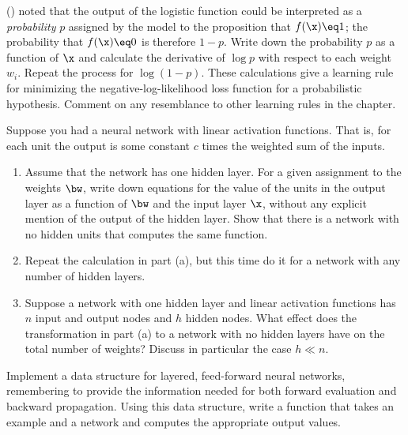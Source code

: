 \begin{exercise}
() noted that the output of the
logistic function could be interpreted as a {\em probability} \(p\)
assigned by the model to the proposition that \(f(\x)\eq 1\); the
probability that \(f(\x)\eq 0\) is therefore \(1-p\).  Write down the
probability \(p\) as a function of \(\x\) and calculate the derivative
of \(\log p\) with respect to each weight \(w_i\).  Repeat the process
for \(\log (1-p)\). These calculations give a learning rule for
minimizing the negative-log-likelihood loss function for a
probabilistic hypothesis. Comment on any resemblance to other learning
rules in the chapter.
\end{exercise} 

\begin{exercise}%
Suppose you had a neural network with linear activation functions.  That is,
for each unit the output is some constant \(c\) times the weighted sum of the
inputs.
\begin{enumerate}
\item 
Assume that the network has one hidden layer.  For a given assignment to
the weights \(\bw\), write down equations for the value of the units in the
output layer as a function of \(\bw\) and the input layer \(\x\), without
any explicit mention of the output of the hidden layer.  Show that there is
a network with no hidden units that computes the same function.

\item  Repeat the calculation in part (a), but this time do it for a network with any
number of hidden layers.  

\item Suppose a network with one hidden layer and linear activation functions has \(n\) input and output nodes and \(h\) hidden nodes.
What effect does the transformation in part (a) to a network with no
hidden layers have on the total number of weights? Discuss in
particular the case \(h \ll n\).
\end{enumerate}
\end{exercise} 

\begin{iexercise} \prgex
Implement a data structure for layered, feed-forward neural networks,
remembering to provide the information needed for both forward
evaluation and backward propagation.
Using this data structure, 
write a function  that takes an example
and a network and computes the appropriate output values.
\end{iexercise} 

